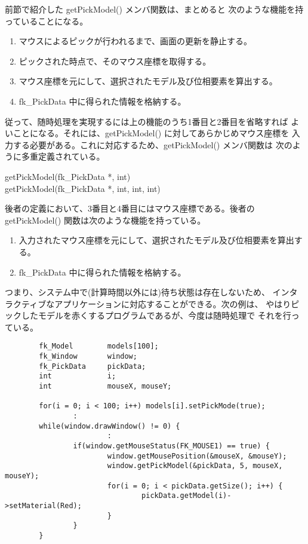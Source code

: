 前節で紹介した getPickModel() メンバ関数は、まとめると
次のような機能を持っていることになる。
\begin{enumerate}
 \item マウスによるピックが行われるまで、画面の更新を静止する。
 \item ピックされた時点で、そのマウス座標を取得する。
 \item マウス座標を元にして、選択されたモデル及び位相要素を算出する。
 \item fk\_PickData 中に得られた情報を格納する。
\end{enumerate}
従って、随時処理を実現するには上の機能のうち1番目と2番目を省略すれば
よいことになる。それには、getPickModel() に対してあらかじめマウス座標を
入力する必要がある。これに対応するため、getPickModel() メンバ関数は
次のように多重定義されている。
\begin{description}
 \item[\hspace*{1cm}getPickModel(fk\_PickData *, int)]
 \item[\hspace*{1cm}getPickModel(fk\_PickData *, int, int, int)]
\end{description}
後者の定義において、3番目と4番目にはマウス座標である。後者の
getPickModel() 関数は次のような機能を持っている。
\begin{enumerate}
 \item 入力されたマウス座標を元にして、選択されたモデル及び位相要素を算出する。
 \item fk\_PickData 中に得られた情報を格納する。
\end{enumerate}
つまり、システム中で(計算時間以外には)待ち状態は存在しないため、
インタラクティブなアプリケーションに対応することができる。次の例は、
やはりピックしたモデルを赤くするプログラムであるが、今度は随時処理で
それを行っている。
\\
\begin{breakbox}
\begin{verbatim}
        fk_Model        models[100];
        fk_Window       window;
        fk_PickData     pickData;
        int             i;
        int             mouseX, mouseY;

        for(i = 0; i < 100; i++) models[i].setPickMode(true);
                :
        while(window.drawWindow() != 0) {
                        :
                if(window.getMouseStatus(FK_MOUSE1) == true) {
                        window.getMousePosition(&mouseX, &mouseY);
                        window.getPickModel(&pickData, 5, mouseX, mouseY);
                        for(i = 0; i < pickData.getSize(); i++) {
                                pickData.getModel(i)->setMaterial(Red);
                        }
                }
        }
\end{verbatim}
\end{breakbox}

